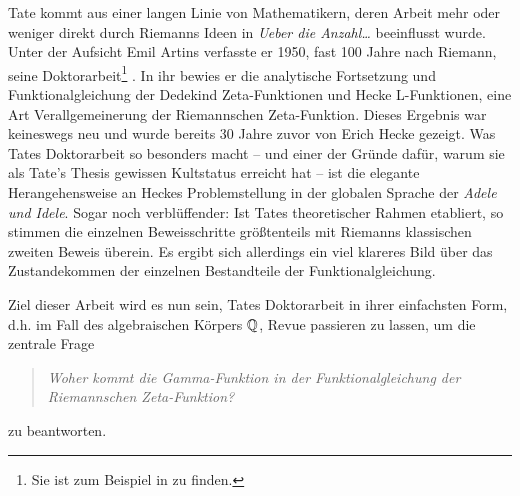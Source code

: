 	Tate kommt aus einer langen Linie von Mathematikern, deren Arbeit mehr oder weniger direkt durch Riemanns Ideen in \emph{Ueber die Anzahl\dots} beeinflusst wurde.
	Unter der Aufsicht Emil Artins verfasste er 1950, fast 100 Jahre nach Riemann, seine Doktorarbeit\footnote{Sie ist zum Beispiel in \cite{cassels1967algebraic} zu finden.}   \cite{tate}. 
	In ihr bewies er die analytische Fortsetzung und Funktionalgleichung der Dedekind Zeta-Funktionen und Hecke L-Funktionen, eine Art Verallgemeinerung der Riemannschen Zeta-Funktion.
	Dieses Ergebnis war keineswegs neu und wurde bereits 30 Jahre zuvor von Erich Hecke gezeigt.
	Was Tates Doktorarbeit so besonders macht -- und einer der Gründe dafür, warum sie als  \glqq Tate's Thesis\grqq{} gewissen Kultstatus erreicht hat -- ist die elegante Herangehensweise an Heckes Problemstellung in der globalen Sprache der \emph{Adele und Idele}.
	Sogar noch verblüffender: Ist Tates theoretischer Rahmen etabliert, so stimmen die einzelnen Beweisschritte größtenteils mit Riemanns klassischen zweiten Beweis überein.
	Es ergibt sich allerdings ein viel klareres Bild über das Zustandekommen der einzelnen Bestandteile der Funktionalgleichung.
	
	Ziel dieser Arbeit wird es nun sein, Tates Doktorarbeit in ihrer einfachsten Form, d.h. im Fall des algebraischen Körpers $\mathbb{Q}$, Revue passieren zu lassen, um die zentrale Frage
	\begin{quote}
		\centering
		\textit{Woher kommt die Gamma-Funktion in der Funktionalgleichung der Riemannschen Zeta-Funktion?}
	\end{quote}
	zu beantworten. 
	
